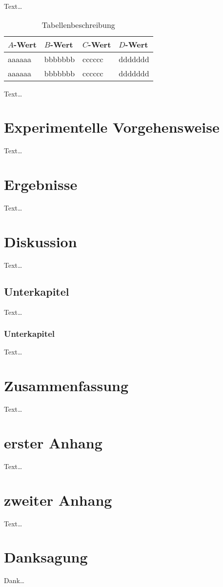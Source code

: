 \documentclass[diplom,         %
               12pt,           %
               twoside,        %
               BCOR10mm,       %
               english,ngerman, %
               ]{IMTEKda}
\begin{document}
Text\dots
\begin{table}
  \centering
  \begin{tabular}{llll}
    \toprule
    $A$-Wert&$B$-Wert&$C$-Wert&$D$-Wert\\
    \midrule
    aaaaaa&bbbbbbb&cccccc&ddddddd\\
    aaaaaa&bbbbbbb&cccccc&ddddddd\\
    \bottomrule
  \end{tabular}
  \caption{Tabellenbeschreibung}
  \label{tab:tabellenplatzhalter}
\end{table}

Text\dots

\chapter{Experimentelle Vorgehensweise}
Text\dots
\chapter{Ergebnisse}
Text\dots
\chapter{Diskussion}
Text\dots
\section{Unterkapitel}
Text\dots
\subsection{Unterkapitel}
Text\dots
\chapter{Zusammenfassung}
Text\dots

\appendix
\chapter{erster Anhang}
Text\dots
\chapter{zweiter Anhang}
Text\dots

\cleardoublepage{}

\chapter*{Danksagung}
Dank\dots
\end{document}
